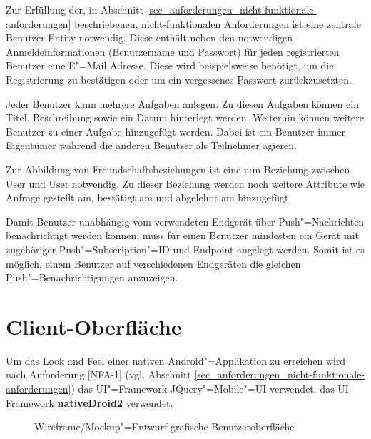 Zur Erfüllung der, in Abschnitt \ref{sec_anforderungen_nicht-funktionale-anforderungen} beschriebenen, nicht-funktionalen Anforderungen ist eine zentrale Benutzer-Entity notwendig. Diese enthält neben den notwendigen Anmeldeinformationen (Benutzername und Passwort) für jeden registrierten Benutzer eine E"=Mail Adresse. Diese wird beispielsweise benötigt, um die Registrierung zu bestätigen oder um ein vergessenes Passwort zurückzusetzten. 

Jeder Benutzer kann mehrere Aufgaben anlegen. Zu diesen Aufgaben können ein Titel, Beschreibung sowie ein Datum hinterlegt werden. Weiterhin können weitere Benutzer zu einer Aufgabe hinzugefügt werden. Dabei ist ein Benutzer immer \glqq{}Eigentümer\grqq{} während die anderen Benutzer als \glqq{}Teilnehmer\grqq{} agieren.

Zur Abbildung von Freundschaftsbeziehungen ist eine n:m-Beziehung zwischen User und User notwendig. Zu dieser Beziehung werden noch weitere Attribute wie \glqq{}Anfrage gestellt am\grqq{}, \glqq{}bestätigt am\grqq{} und \glqq{}abgelehnt am\grqq{} hinzugefügt.

Damit Benutzer unabhängig vom verwendeten Endgerät über Push"=Nachrichten benachrichtigt werden können, muss für einen Benutzer mindesten ein Gerät mit zugehöriger Push"=Subscription"=ID und Endpoint angelegt werden. Somit ist es möglich, einem Benutzer auf verschiedenen Endgeräten die gleichen Push"=Benachrichtigungen anzuzeigen.

\section{Client-Oberfläche}
\label{sec_konzeption_client-ui}

Um das \glqq{}Look and Feel\grqq{} einer nativen Android"=Applikation zu erreichen wird nach Anforderung [NFA-1] (vgl. Abschnitt \ref{sec_anforderungen_nicht-funktionale-anforderungen}) das UI"=Framework \glqq JQuery"=Mobile"=UI\grqq{} verwendet.    das UI-Framework \textbf{nativeDroid2} verwendet. \\


\begin{figure}[htp] 
\caption{Wireframe/Mockup"=Entwurf grafische Benutzeroberfläche}
\label{image_konzeption_datenmodell}
\end{figure} 

